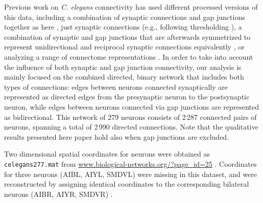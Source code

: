\documentclass[10pt,letterpaper]{article}
\begin{document}
Previous work on \emph{C. elegans} connectivity has used different processed versions of this data, including a combination of synaptic connections and gap junctions together as here \cite{Azulay:2016cg, Kim:2016gl}, just synaptic connections (e.g., following thresholding \cite{Kashtan:2004ev}), a combination of synaptic and gap junctions that are afterwards symmetrized to represent unidirectional and reciprocal synaptic connections equivalently \cite{Towlson:2013gf, Kim:2014bu, Pavlovic:2014gx}, or analyzing a range of connectome representations \cite{Pan:2010jt}.
In order to take into account the influence of both synaptic and gap junction connectivity, our analysis is mainly focused on the combined directed, binary network that includes both types of connections: edges between neurons connected synaptically are represented as directed edges from the presynaptic neuron to the postsynaptic neuron, while edges between neurons connected via gap junctions are represented as bidirectional.
This network of 279 neurons consists of 2\,287 connected pairs of neurons, spanning a total of 2\,990 directed connections.
Note that the qualitative results presented here paper hold also when gap junctions are excluded.

Two dimensional spatial coordinates for neurons were obtained as \texttt{celegans277.mat} from \url{www.biological-networks.org/?page_id=25} \cite{choe2004network}.
Coordinates for three neurons (AIBL, AIYL, SMDVL) were missing in this dataset, and were reconstructed by assigning identical coordinates to the corresponding bilateral neurons (AIBR, AIYR, SMDVR) \cite{Varier2011}.
\end{document}

